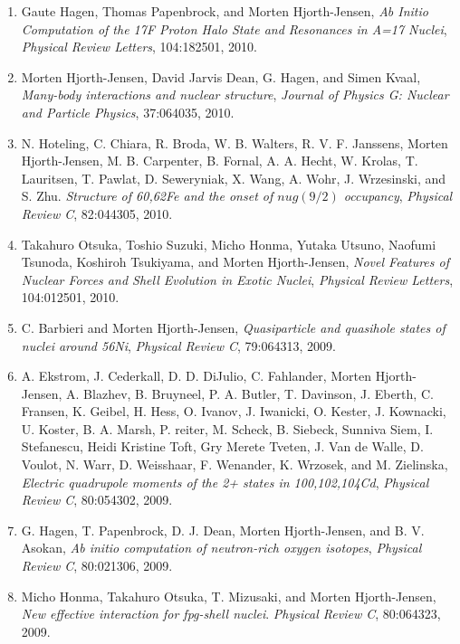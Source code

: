\documentclass[a4wide,10pt]{article}
\begin{document}
\begin{enumerate}
\item Gaute Hagen, Thomas Papenbrock, and Morten Hjorth-Jensen,  \emph{Ab Initio Computation of the 17F Proton Halo State and Resonances in A=17 Nuclei},  \emph{Physical Review Letters}, 104:182501, 2010. 

\item Morten Hjorth-Jensen, David Jarvis Dean, G. Hagen, and Simen Kvaal,  \emph{Many-body interactions and nuclear structure},  \emph{Journal of Physics G: Nuclear and Particle Physics}, 37:064035,   2010. 

\item N. Hoteling, C. Chiara, R. Broda, W. B. Walters, R. V. F. Janssens, Morten   Hjorth-Jensen, M. B. Carpenter, B. Fornal, A. A. Hecht, W. Krolas,   T. Lauritsen, T. Pawlat, D. Seweryniak, X. Wang, A. Wohr, J. Wrzesinski, and   S. Zhu.  \emph{Structure of 60,62Fe and the onset of $nu g(9/2)$ occupancy},  \emph{Physical Review C}, 82:044305, 2010. 

\item Takahuro Otsuka, Toshio Suzuki, Micho Honma, Yutaka Utsuno, Naofumi Tsunoda,   Koshiroh Tsukiyama, and Morten Hjorth-Jensen,  \emph{Novel Features of Nuclear Forces and Shell Evolution in Exotic Nuclei},  \emph{Physical Review Letters}, 104:012501, 2010. 

\item C. Barbieri and Morten Hjorth-Jensen,  \emph{Quasiparticle and quasihole states of nuclei around 56Ni},  \emph{Physical Review C}, 79:064313, 2009. 

\item A. Ekstrom, J. Cederkall, D. D. DiJulio, C. Fahlander, Morten Hjorth-Jensen,   A. Blazhev, B. Bruyneel, P. A. Butler, T. Davinson, J. Eberth, C. Fransen,   K. Geibel, H. Hess, O. Ivanov, J. Iwanicki, O. Kester, J. Kownacki,   U. Koster, B. A. Marsh, P. reiter, M. Scheck, B. Siebeck, Sunniva Siem,   I. Stefanescu, Heidi Kristine Toft, Gry Merete Tveten, J. Van de Walle,   D. Voulot, N. Warr, D. Weisshaar, F. Wenander, K. Wrzosek, and M. Zielinska,  \emph{Electric quadrupole moments of the 2+ states in  100,102,104Cd},  \emph{Physical Review C}, 80:054302, 2009. 

\item G. Hagen, T. Papenbrock, D. J. Dean, Morten Hjorth-Jensen, and B. V. Asokan,  \emph{Ab initio computation of neutron-rich oxygen isotopes},  \emph{Physical Review C}, 80:021306, 2009. 

\item Micho Honma, Takahuro Otsuka, T. Mizusaki, and Morten Hjorth-Jensen,  \emph{New effective interaction for fpg-shell nuclei}.  \emph{Physical Review C}, 80:064323, 2009. 


\end{enumerate}
\end{document}
